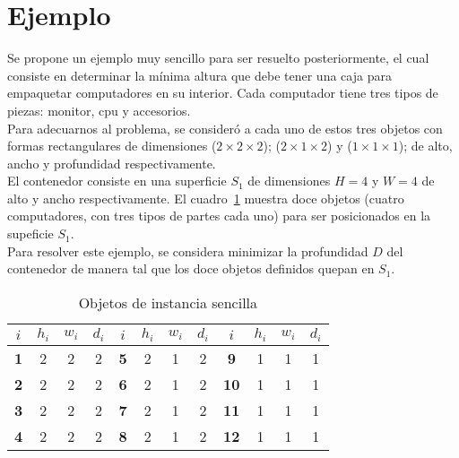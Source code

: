\section{Ejemplo\label{sec:ejemplo}}
Se propone un ejemplo muy sencillo para ser resuelto posteriormente,
el cual consiste en determinar la mínima altura que debe tener una caja para
empaquetar computadores en su interior. Cada computador tiene tres tipos de piezas:
monitor, cpu y accesorios. \\

Para adecuarnos al problema, se consideró a cada uno de estos tres objetos
con formas rectangulares de dimensiones ($2\times 2\times 2$);
($2\times 1\times 2$) y ($1\times 1\times 1$); de alto, ancho y profundidad
respectivamente. \\

El contenedor consiste en una superficie $S_1$ de dimensiones
$H=4$ y $W=4$ de alto y ancho respectivamente. El cuadro~\ref{tabla:uno}
muestra doce objetos (cuatro computadores, con tres tipos de partes cada
uno) para ser posicionados en la supeficie $S_1$. \\

Para resolver este ejemplo, se considera minimizar la profundidad $D$
del contenedor de manera tal que los doce objetos definidos quepan en $S_1$.

\begin{table}[h]
\begin{center}
\begin{tabular}{||c|c c c||c|c c c||c|c c c||}
\hline\hline
$i$ & $h_i$ & $w_i$ & $d_i$ & $i$ & $h_i$ & $w_i$ & $d_i$ & $i$ & $h_i$ & $w_i$ & $d_i$ \\ \hline
\textbf{1} & 2 & 2 & 2 & \textbf{5} & 2 & 1 & 2 & \textbf{9} & 1 & 1 & 1 \\
\textbf{2} & 2 & 2 & 2 & \textbf{6} & 2 & 1 & 2 & \textbf{10} & 1 & 1 & 1 \\
\textbf{3} & 2 & 2 & 2 & \textbf{7} & 2 & 1 & 2 & \textbf{11} & 1 & 1 & 1 \\
\textbf{4} & 2 & 2 & 2 & \textbf{8} & 2 & 1 & 2 & \textbf{12} & 1 & 1 & 1 \\
\hline\hline
\end{tabular}
\caption{Objetos de instancia sencilla}
\label{tabla:uno}
\end{center}
\end{table}
